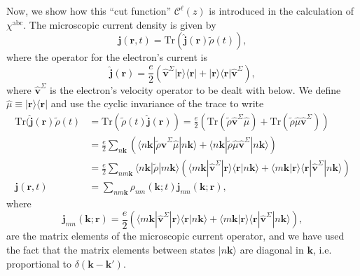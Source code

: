 Now, we show how this ``cut function'' $\mathcal{C}^{\ell}(z)$ is introduced in
the calculation of $\chi^{\mathrm{abc}}$. 
The microscopic current density is given by
\begin{equation}\label{jmic}
\mathbf{j}(\mathbf{r},t)=\mathrm{Tr}(\hat{\mathbf{j}}(\mathbf{r})\tilde{\rho}(t)),
\end{equation}
where the operator for the electron's current is
\begin{equation}\label{hatjmic}
\hat{\mathbf{j}}(\mathbf{r})=\frac{e}{2}\left(\hat{\mathbf{v}}^{\Sigma} |\mathbf{r}\rangle\langle\mathbf{r}|
+ |\mathbf{r}\rangle\langle\mathbf{r}|\hat{\mathbf{v}}^{\Sigma}\right), 
\end{equation}
where $\hat{\mathbf{v}}^{\Sigma}$ is the electron's velocity operator to be dealt
with below. We define
$\hat{\mu} \equiv |\mathbf{r}\rangle\langle\mathbf{r}|$ and use the cyclic invariance of
the trace to write
\begin{align}\label{jmic2}
\mathrm{Tr}(\hat{\mathbf{j}}(\mathbf{r})\tilde{\rho}(t)
&= \mathrm{Tr}(\tilde{\rho}(t)\hat{\mathbf{j}}(\mathbf{r}))
= \frac{e}{2}
\left(
  \mathrm{Tr}(\tilde{\rho}\hat{\mathbf{v}}^{\Sigma}\hat{\mu})
+ \mathrm{Tr}(\tilde{\rho}\hat{\mu}\hat{\mathbf{v}}^{\Sigma})
\right)\nonumber\\
&= \frac{e}{2}\sum_{n\mathbf{k}}
\left(
\langle n\mathbf{k}| \tilde{\rho}\hat{\mathbf{v}}^{\Sigma}\hat{\mu} |n\mathbf{k}\rangle
+ \langle n\mathbf{k}| \tilde{\rho}\hat{\mu}\hat{\mathbf{v}}^{\Sigma} |n\mathbf{k}\rangle
\right)\nonumber\\
&= \frac{e}{2}\sum_{nm\mathbf{k}}\langle n\mathbf{k}|\tilde{\rho} |m\mathbf{k}\rangle
\left(
\langle m\mathbf{k}| \hat{\mathbf{v}}^{\Sigma}|\mathbf{r}\rangle \langle\mathbf{r}|n\mathbf{k}\rangle
+ \langle m\mathbf{k}|\mathbf{r}\rangle \langle\mathbf{r}| \hat{\mathbf{v}}^{\Sigma} |n\mathbf{k}\rangle
\right)
\nonumber\\
\mathbf{j}(\mathbf{r},t)
&= \sum_{nm\mathbf{k}}\rho_{nm}(\mathbf{k};t)\mathbf{j}_{mn}(\mathbf{k};\mathbf{r}),
\end{align}
where
\begin{equation}\label{jmic3}
\mathbf{j}_{mn}(\mathbf{k};\mathbf{r})=
\frac{e}{2}
\left(
\langle m\mathbf{k}| \hat{\mathbf{v}}^{\Sigma} |\mathbf{r}\rangle \langle\mathbf{r}|n\mathbf{k}\rangle
+
\langle m\mathbf{k}|\mathbf{r}\rangle \langle\mathbf{r}| \hat{\mathbf{v}}^{\Sigma} |n\mathbf{k}\rangle
\right),
\end{equation}
are the matrix elements of the microscopic current operator,
and we have used the fact that the matrix elements between states $|n\mathbf{k}\rangle$
are diagonal in $\mathbf{k}$, i.e. proportional to $\delta(\mathbf{k}-\mathbf{k}')$.

